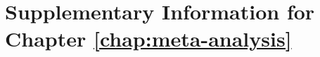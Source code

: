 \chapter{Supplementary Information for Chapter \ref{chap:meta-analysis}}\label{app:meta-analysis}

\graphicspath{{meta-analysis/figures/}}


